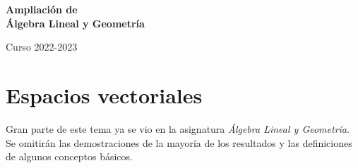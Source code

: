 \documentclass[12pt]{report}
\theoremstyle{definition}
\theoremstyle{definition}
\theoremstyle{remark}
\begin{document}
\setlength{\abovedisplayskip}{10pt}
\setlength{\belowdisplayskip}{10pt}

\thispagestyle{empty} %

\begin{center}
    \vspace*{1cm} %
    \Huge \textbf{Ampliación de \\ Álgebra Lineal y Geometría}
        
    \vspace{10mm} %
    \large
        
    Curso 2022-2023
\end{center}

\tableofcontents


\chapter{Espacios vectoriales}

\setcounter{page}{4}

Gran parte de este tema ya se vio en la asignatura \textit{Álgebra Lineal y Geometría}. Se omitirán las demostraciones de la mayoría de los resultados y las definiciones de algunos conceptos básicos.
\end{document}

